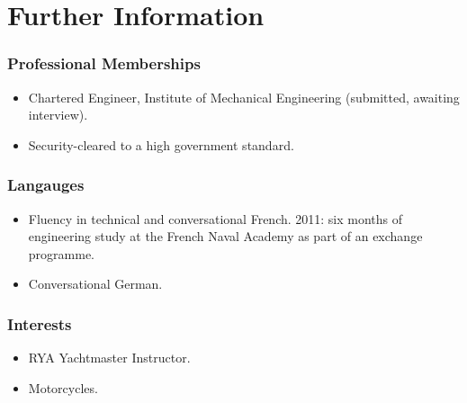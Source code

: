\documentclass[a4paper, oneside, final, 11pt]{scrartcl} %
\begin{document}
\section{Further Information}
\subsubsection*{Professional Memberships}

\begin{itemize}	
\item Chartered Engineer, Institute of Mechanical Engineering (submitted, awaiting interview).
\item Security-cleared to a high government standard.
\end{itemize}

\subsubsection*{Langauges}
\begin{itemize}	
\item Fluency in technical and conversational French. 2011: six months of engineering study at the French Naval Academy as part of an exchange programme. 
\item Conversational German. 
\end{itemize}

\subsubsection*{Interests}
\begin{itemize}	
 \item RYA Yachtmaster Instructor.
 \item Motorcycles. 
\end{itemize}






\end{document}

